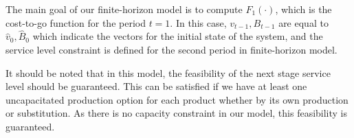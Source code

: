 \documentclass[10pt]{article}
\newcommand{\ti}{t} %
\newcommand{\ka}{k} %
\newcommand{\KA}{\mathcal{K}}
\newcommand{\Ka}{K}
\newcommand{\jey}{j} %
\newcommand{\Graf}{\mathcal{A}} %
\newcommand{\Bi}{B} %
\newcommand{\Vi}{v} %
\newcommand{\Es}{S} %
\newcommand{\x}{x} %
\newcommand{\y}{y} %
\newcommand{\Csub}{\mathcal{K}^+_k}
\newcommand{\Psub}{\mathcal{K}^-_k}
\newcommand{\tAct}{\hat{\ti}} %
\begin{document}
The main goal of our finite-horizon model is to compute $F_{1}(\cdot)$, which is the cost-to-go function for the period $\ti =1$. In this case, $\Vi_{t-1}, \Bi_{t-1}$ are equal to $\hat{\Vi}_{0},\hat{\Bi}_{0}$ which indicate the vectors for the initial state of the system, and the service level constraint is defined for the second period in finite-horizon model.


It should be noted that in this model, the feasibility of the next stage service level should be guaranteed. This can be satisfied if we have at least one uncapacitated production option for each product whether by its own production or substitution. As there is no capacity constraint in our model, this feasibility is guaranteed.
\end{document}

